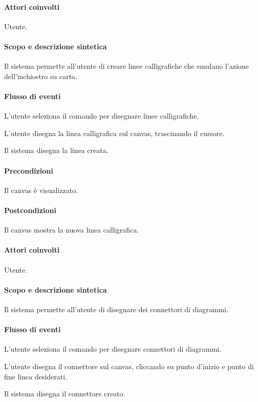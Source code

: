 \paragraph{Attori coinvolti} Utente.
\paragraph{Scopo e descrizione sintetica} 
Il sistema permette all'utente di creare linee calligrafiche che emulano l'azione dell'inchiostro su carta.
\paragraph{Flusso di eventi}
\begin{elenconumerato}[\textbf{}]{\subsubsecindent}
\item L'utente seleziona il comando per disegnare linee calligrafiche.
\item L'utente disegna la linea calligrafica sul canvas, trascinando il cursore.
\item Il sistema disegna la linea creata.
\end{elenconumerato}
\paragraph{Precondizioni} Il canvas \`e visualizzato.
\paragraph{Postcondizioni} Il canvas mostra la nuova linea calligrafica.

\paragraph{Attori coinvolti} Utente.
\paragraph{Scopo e descrizione sintetica} 
Il sistema permette all'utente di disegnare dei connettori di diagrammi.
\paragraph{Flusso di eventi}
\begin{elenconumerato}[\textbf{}]{\subsubsecindent}
\item L'utente seleziona il comando per disegnare connettori di diagrammi.
\item L'utente disegna il connettore sul canvas, cliccando su punto d'inizio e punto di fine linea desiderati.
\item Il sistema disegna il connettore creato.
\end{elenconumerato}
